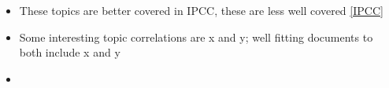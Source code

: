 \documentclass{article}
\begin{document}
%

\begin{itemize}
    \item These topics are better covered in IPCC, these are less well covered \ref{IPCC}
    \item Some interesting topic correlations are x and y; well fitting documents to both include x and y
    \item
\end{itemize}

\end{document}
